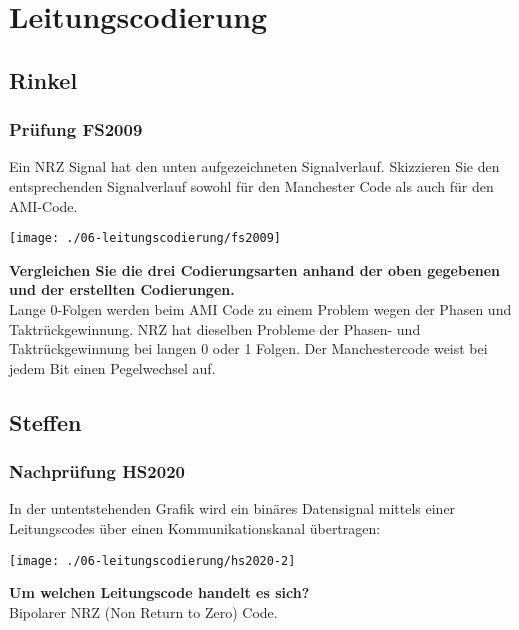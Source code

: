 

\section{Leitungscodierung}
\subsection{Rinkel}
\subsubsection{Prüfung FS2009}
Ein NRZ Signal hat den unten aufgezeichneten Signalverlauf. Skizzieren Sie den entsprechenden Signalverlauf sowohl für den Manchester Code als auch für den AMI-Code.
\begin{center}
    \vspace{-8pt}
    \texttt{[image: ./06-leitungscodierung/fs2009]}
    \vspace{-8pt}
\end{center}

\textbf{Vergleichen Sie die drei Codierungsarten anhand der oben gegebenen und der erstellten Codierungen.}\\
Lange 0-Folgen werden beim AMI Code zu einem Problem wegen der Phasen und Taktrückgewinnung. NRZ hat dieselben Probleme der Phasen- und Taktrückgewinnung bei
langen 0 oder 1 Folgen. Der Manchestercode weist bei jedem Bit einen Pegelwechsel auf.

\subsection{Steffen}

\subsubsection{Nachprüfung HS2020}
In der untentstehenden Grafik wird ein binäres Datensignal mittels einer Leitungscodes über einen Kommunikationskanal übertragen:
\begin{center}
    \vspace{-8pt}
    \texttt{[image: ./06-leitungscodierung/hs2020-2]}
    \vspace{-8pt}
\end{center}

\textbf{Um welchen Leitungscode handelt es sich?}\\
Bipolarer NRZ (Non Return to Zero) Code.\\

